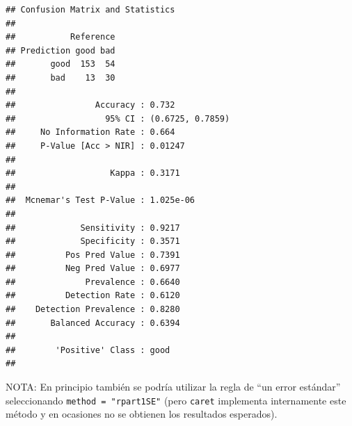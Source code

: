 \documentclass[
  spanish,
]{book}
\newenvironment{Shaded}{\begin{snugshade}}{\end{snugshade}}
\newcommand{\AttributeTok}[1]{\textcolor[rgb]{0.77,0.63,0.00}{#1}}
\newcommand{\CommentTok}[1]{\textcolor[rgb]{0.56,0.35,0.01}{\textit{#1}}}
\newcommand{\DecValTok}[1]{\textcolor[rgb]{0.00,0.00,0.81}{#1}}
\newcommand{\FunctionTok}[1]{\textcolor[rgb]{0.00,0.00,0.00}{#1}}
\newcommand{\NormalTok}[1]{#1}
\newcommand{\OtherTok}[1]{\textcolor[rgb]{0.56,0.35,0.01}{#1}}
\newcommand{\SpecialCharTok}[1]{\textcolor[rgb]{0.00,0.00,0.00}{#1}}
\newcommand{\StringTok}[1]{\textcolor[rgb]{0.31,0.60,0.02}{#1}}
\theoremstyle{break}
\theoremstyle{definition}
\theoremstyle{definition}
\theoremstyle{definition}
\theoremstyle{definition}
\theoremstyle{remark}
\begin{document}
\begin{Shaded}
\end{Shaded}

\begin{verbatim}
## Confusion Matrix and Statistics
## 
##           Reference
## Prediction good bad
##       good  153  54
##       bad    13  30
##                                           
##                Accuracy : 0.732           
##                  95% CI : (0.6725, 0.7859)
##     No Information Rate : 0.664           
##     P-Value [Acc > NIR] : 0.01247         
##                                           
##                   Kappa : 0.3171          
##                                           
##  Mcnemar's Test P-Value : 1.025e-06       
##                                           
##             Sensitivity : 0.9217          
##             Specificity : 0.3571          
##          Pos Pred Value : 0.7391          
##          Neg Pred Value : 0.6977          
##              Prevalence : 0.6640          
##          Detection Rate : 0.6120          
##    Detection Prevalence : 0.8280          
##       Balanced Accuracy : 0.6394          
##                                           
##        'Positive' Class : good            
## 
\end{verbatim}

NOTA: En principio también se podría utilizar la regla de ``un error estándar'' seleccionando \texttt{method\ =\ "rpart1SE"} (pero \texttt{caret} implementa internamente este método y en ocasiones no se obtienen los resultados esperados).

\begin{Shaded}
\end{Shaded}
\end{document}
